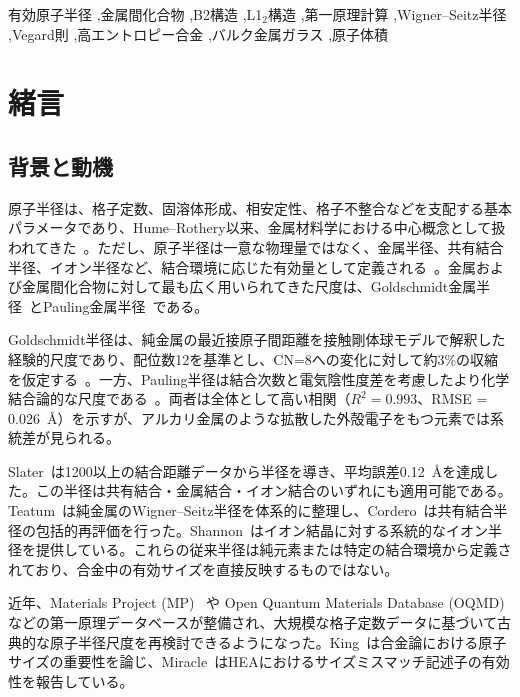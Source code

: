 \documentclass[a4paper,10pt,5p]{elsarticle}
\begin{document}
\begin{frontmatter}
\begin{abstract}
\end{abstract}

\begin{keyword}
有効原子半径 \sep 金属間化合物 \sep B2構造 \sep L1$_2$構造 \sep 第一原理計算 \sep Wigner--Seitz半径 \sep Vegard則 \sep 高エントロピー合金 \sep バルク金属ガラス \sep 原子体積
\end{keyword}

\end{frontmatter}




\section{緒言}

\subsection{背景と動機}
原子半径は、格子定数、固溶体形成、相安定性、格子不整合などを支配する基本パラメータであり、Hume--Rothery以来、金属材料学における中心概念として扱われてきた~\cite{humerothery1936}。ただし、原子半径は一意な物理量ではなく、金属半径、共有結合半径、イオン半径など、結合環境に応じた有効量として定義される~\cite{slater1964atomic}。金属および金属間化合物に対して最も広く用いられてきた尺度は、Goldschmidt金属半径~\cite{goldschmidt1927}とPauling金属半径~\cite{pauling1947}である。

Goldschmidt半径は、純金属の最近接原子間距離を接触剛体球モデルで解釈した経験的尺度であり、配位数12を基準とし、CN=8への変化に対して約3\%の収縮を仮定する~\cite{goldschmidt1927}。一方、Pauling半径は結合次数と電気陰性度差を考慮したより化学結合論的な尺度である~\cite{pauling1947}。両者は全体として高い相関（$R^2 = 0.993$、RMSE = 0.026~\AA）を示すが、アルカリ金属のような拡散した外殻電子をもつ元素では系統差が見られる。

Slater~\cite{slater1964atomic}は1200以上の結合距離データから半径を導き、平均誤差0.12~\AA を達成した。この半径は共有結合・金属結合・イオン結合のいずれにも適用可能である。Teatum~\cite{teatum1960}は純金属のWigner--Seitz半径を体系的に整理し、Cordero~\cite{cordero2008}は共有結合半径の包括的再評価を行った。Shannon~\cite{shannon1976}はイオン結晶に対する系統的なイオン半径を提供している。これらの従来半径は純元素または特定の結合環境から定義されており、合金中の有効サイズを直接反映するものではない。

近年、Materials Project (MP)~\cite{jain2013} や Open Quantum Materials Database (OQMD)~\cite{saal2013} などの第一原理データベースが整備され、大規模な格子定数データに基づいて古典的な原子半径尺度を再検討できるようになった。King~\cite{king1966}は合金論における原子サイズの重要性を論じ、Miracle~\cite{miracle2017}はHEAにおけるサイズミスマッチ記述子の有効性を報告している。
\end{document}
